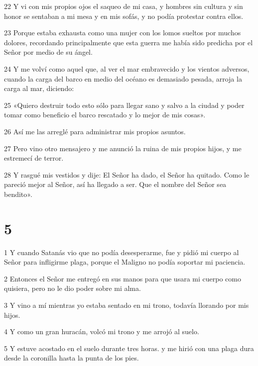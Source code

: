 \par 22 Y vi con mis propios ojos el saqueo de mi casa, y hombres sin cultura y sin honor se sentaban a mi mesa y en mis sofás, y no podía protestar contra ellos.

\par 23 Porque estaba exhausta como una mujer con los lomos sueltos por muchos dolores, recordando principalmente que esta guerra me había sido predicha por el Señor por medio de su ángel.

\par 24 Y me volví como aquel que, al ver el mar embravecido y los vientos adversos, cuando la carga del barco en medio del océano es demasiado pesada, arroja la carga al mar, diciendo:

\par 25 «Quiero destruir todo esto sólo para llegar sano y salvo a la ciudad y poder tomar como beneficio el barco rescatado y lo mejor de mis cosas».

\par 26 Así me las arreglé para administrar mis propios asuntos.

\par 27 Pero vino otro mensajero y me anunció la ruina de mis propios hijos, y me estremecí de terror.

\par 28 Y rasgué mis vestidos y dije: El Señor ha dado, el Señor ha quitado. Como le pareció mejor al Señor, así ha llegado a ser. Que el nombre del Señor sea bendito».

\chapter{5}

\par 1 Y cuando Satanás vio que no podía desesperarme, fue y pidió mi cuerpo al Señor para infligirme plaga, porque el Maligno no podía soportar mi paciencia.

\par 2 Entonces el Señor me entregó en sus manos para que usara mi cuerpo como quisiera, pero no le dio poder sobre mi alma.

\par 3 Y vino a mí mientras yo estaba sentado en mi trono, todavía llorando por mis hijos.

\par 4 Y como un gran huracán, volcó mi trono y me arrojó al suelo.

\par 5 Y estuve acostado en el suelo durante tres horas. y me hirió con una plaga dura desde la coronilla hasta la punta de los pies.

